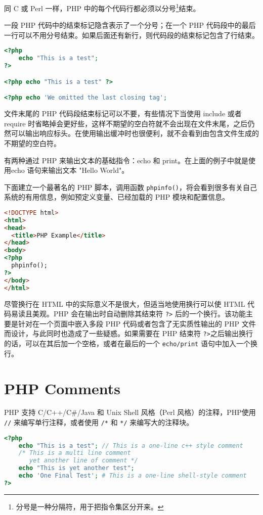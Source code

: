 同 C 或 Perl 一样，PHP 中的每个代码行都必须以分号\footnote{分号是一种分隔符，用于把指令集区分开来。}结束。

一段 PHP 代码中的结束标记隐含表示了一个分号；在一个 PHP 代码段中的最后一行可以不用分号结束。如果后面还有新行，则代码段的结束标记包含了行结束。

\begin{lstlisting}[language=PHP]
<?php
    echo "This is a test";
?>

<?php echo "This is a test" ?>

<?php echo 'We omitted the last closing tag';
\end{lstlisting}

文件末尾的 PHP 代码段结束标记可以不要，有些情况下当使用 include 或者 require 时省略掉会更好些，这样不期望的空白符就不会出现在文件末尾，之后仍然可以输出响应标头。在使用输出缓冲时也很便利，就不会看到由包含文件生成的不期望的空白符。



有两种通过 PHP 来输出文本的基础指令：echo 和 print。在上面的例子中就是使用echo 语句来输出文本 "Hello World"。

下面建立一个最著名的 PHP 脚本，调用函数 \texttt{phpinfo()}，将会看到很多有关自己系统的有用信息，例如预定义变量、已经加载的 PHP 模块和配置信息。

\begin{lstlisting}[language=HTML]
<!DOCTYPE html>
<html>
<head>
  <title>PHP Example</title>
</head>
<body>
<?php
  phpinfo();
?>
</body>
</html>
\end{lstlisting}

尽管换行在 HTML 中的实际意义不是很大，但适当地使用换行可以使 HTML 代码易读且美观。PHP 会在输出时自动删除其结束符 \texttt{?>} 后的一个换行。该功能主要是针对在一个页面中嵌入多段 PHP 代码或者包含了无实质性输出的 PHP 文件而设计，与此同时也造成了一些疑惑。如果需要在 PHP 结束符 \texttt{?>}之后输出换行的话，可以在其后加一个空格，或者在最后的一个 \texttt{echo/print} 语句中加入一个换行。





\section{PHP Comments}

PHP 支持 C/C++/C\#/Java 和 Unix Shell 风格（Perl 风格）的注释，PHP使用 \texttt{//} 来编写单行注释，或者使用 \texttt{/*} 和 \texttt{*/} 来编写大的注释块。


\begin{lstlisting}[language=PHP]
<?php
    echo "This is a test"; // This is a one-line c++ style comment
    /* This is a multi line comment
       yet another line of comment */
    echo "This is yet another test";
    echo 'One Final Test'; # This is a one-line shell-style comment
?>
\end{lstlisting}

